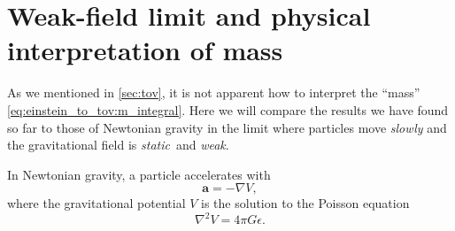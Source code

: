 \section{Weak-field limit and physical interpretation of mass}
\label{sec:weak_field_limit}


As we mentioned in \cref{sec:tov}, it is not apparent how to interpret the ``mass'' \eqref{eq:einstein_to_tov:m_integral}.
Here we will compare the results we have found so far to those of Newtonian gravity in the limit where particles move \emph{slowly} and the gravitational field is \emph{static} and \emph{weak}.

In Newtonian gravity, a particle accelerates with
\begin{equation}
	\mathbf{a} = - \nabla V ,
	\label{eq:interpretation_m:newton2}
\end{equation}
where the gravitational potential $V$ is the solution to the Poisson equation
\begin{equation}
	\nabla^2 V = 4 \pi G \epsilon .
	\label{eq:interpretation_m:poisson}
\end{equation}

